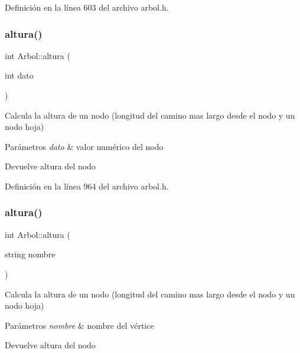 Definición en la línea 603 del archivo arbol.\+h.

\mbox{\label{classArbol_a98151655f0dab81b40d34f87fbbd90cd}} 
\subsubsection{\texorpdfstring{altura()}{altura()}\hspace{0.1cm}{\footnotesize\ttfamily [1/3]}}
{\footnotesize\ttfamily int Arbol\+::altura (\begin{DoxyParamCaption}\item[{int}]{dato }\end{DoxyParamCaption})}



Calcula la altura de un nodo (longitud del camino mas largo desde el nodo y un nodo hoja) 


\begin{DoxyParams}{Parámetros}
{\em dato} & valor numérico del nodo \\
\hline
\end{DoxyParams}
\begin{DoxyReturn}{Devuelve}
altura del nodo 
\end{DoxyReturn}


Definición en la línea 964 del archivo arbol.\+h.

\mbox{\label{classArbol_a7a79cb43ca30b5120f1a8ebe3afbe22c}} 
\subsubsection{\texorpdfstring{altura()}{altura()}\hspace{0.1cm}{\footnotesize\ttfamily [2/3]}}
{\footnotesize\ttfamily int Arbol\+::altura (\begin{DoxyParamCaption}\item[{string}]{nombre }\end{DoxyParamCaption})}



Calcula la altura de un nodo (longitud del camino mas largo desde el nodo y un nodo hoja) 


\begin{DoxyParams}{Parámetros}
{\em nombre} & nombre del vértice \\
\hline
\end{DoxyParams}
\begin{DoxyReturn}{Devuelve}
altura del nodo 
\end{DoxyReturn}


